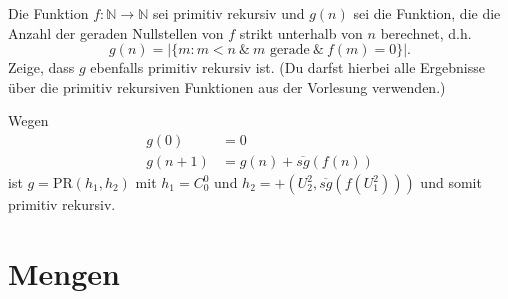 \documentclass[german,headsepline]{scrartcl}
\theoremstyle{definition}
\begin{document}
	\begin{question}[subtitle={Klausur 2009}]
		Die Funktion $f:\mathbb{N}\to\mathbb{N}$ sei primitiv rekursiv und $g(n)$ sei die Funktion,
		die die Anzahl der geraden Nullstellen von $f$ strikt unterhalb von $n$ berechnet, d.h.
		\[g(n)=\vert\{m\colon m<n~\&~m\text{ gerade}~\&~f(m)=0\}\vert.\]
		Zeige, dass $g$ ebenfalls primitiv rekursiv ist.
		(Du darfst hierbei alle Ergebnisse über die primitiv rekursiven Funktionen aus der Vorlesung verwenden.)
	\end{question}
	\begin{solution}
		Wegen
		\begin{align*}
			g(0) &= 0 \\
			g(n+1) &= g(n)+\overline{sg}(f(n))
		\end{align*}
		ist $g=\text{PR}(h_1,h_2)$ mit $h_1=C^0_0$ und $h_2=+(U^2_2,\overline{sg}(f(U^2_1)))$
		und somit primitiv rekursiv.
	\end{solution}
	
	\pagebreak
	\section{Mengen}
\end{document}
